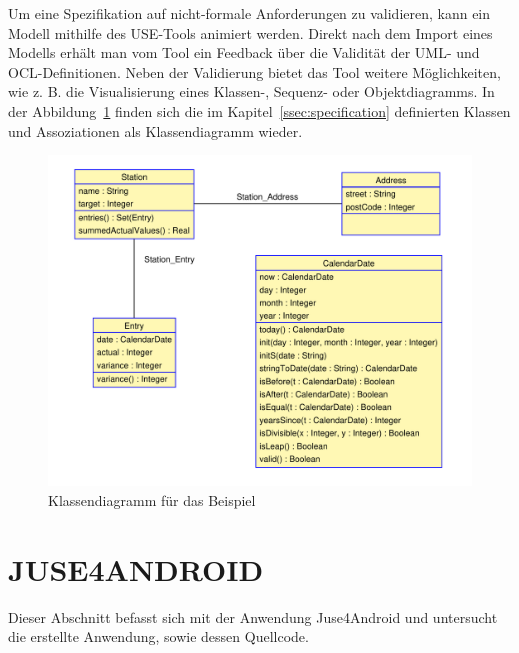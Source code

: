 \documentclass[a4paper,twoside]{article}
\begin{document}
Um eine Spezifikation auf nicht-formale Anforderungen zu validieren, kann ein Modell mithilfe des USE-Tools animiert werden. Direkt nach dem Import eines Modells erhält man vom Tool ein Feedback über die Validität der UML- und OCL-Definitionen. Neben der Validierung bietet das Tool weitere Möglichkeiten, wie z. B. die Visualisierung eines Klassen-, Sequenz- oder Objektdiagramms. In der Abbildung~\ref{fig:Grafik2} finden sich die im Kapitel~\ref{ssec:specification} definierten Klassen und Assoziationen als Klassendiagramm wieder.

\begin{figure}[!h]
	\includegraphics[scale=.4]{pics/USE_class_diagramm.pdf}
	\caption{Klassendiagramm für das Beispiel}
	\label{fig:Grafik2}
\end{figure}


\section{\uppercase{JUSE4Android}}
Dieser Abschnitt befasst sich mit der Anwendung Juse4Android und untersucht die erstellte Anwendung, sowie dessen Quellcode. 
\end{document}
